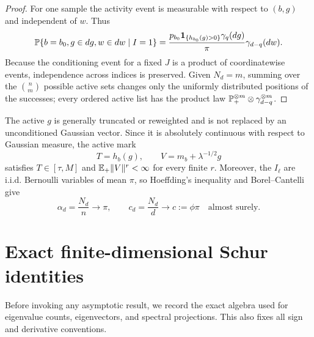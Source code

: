 \begin{proof}
For one sample the activity event is measurable with respect to $(b,g)$ and independent of $w$.
Thus
\begin{equation}
\mathbb{P}\{b=b_0,g\in dg,w\in dw\mid I=1\}
=
\frac{p_{b_0}\mathbf{1}_{\{h_{b_0}(g)>0\}}\gamma_q(dg)}{\pi}
\gamma_{d-q}(dw).
\end{equation}
Because the conditioning event for a fixed $J$ is a product of coordinatewise events, independence
across indices is preserved. Given $N_d=m$, summing over the $\binom nm$ possible active sets
changes only the uniformly distributed positions of the successes; every ordered active list has
the product law $\mathbb{P}_+^{\otimes m}\otimes\gamma_{d-q}^{\otimes m}$.
\end{proof}

The active $g$ is generally truncated or reweighted and is not replaced by an unconditioned
Gaussian vector. Since it is absolutely continuous with respect to Gaussian measure, the active
mark
\begin{equation}
T=h_b(g),\qquad V=m_b+\lambda^{-1/2}g
\label{S:active-mark}
\end{equation}
satisfies $T\in[\tau,M]$ and $\mathbb{E}_+\|V\|^r<\infty$ for every finite $r$.
Moreover, the $I_\ell$ are i.i.d. Bernoulli variables of mean $\pi$, so Hoeffding's inequality and
Borel--Cantelli give
\begin{equation}
\alpha_d=\frac{N_d}{n}\longrightarrow\pi,\qquad
c_d=\frac{N_d}{d}\longrightarrow c:=\phi\pi
\quad\text{almost surely}.
\label{S:active-ratios}
\end{equation}


\section{Exact finite-dimensional Schur identities}

Before invoking any asymptotic result, we record the exact algebra used for
eigenvalue counts, eigenvectors, and spectral projections. This also fixes all
sign and derivative conventions.


